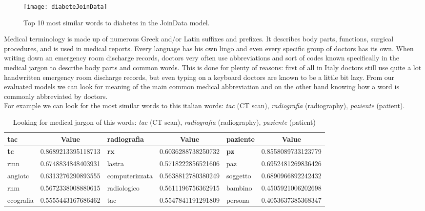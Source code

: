 \begin{figure}[ht]
	\centering
	\texttt{[image: diabeteJoinData]}
	\caption[Diabetes - 10 most similar words plotted for JoinData model]{Top 10 most similar words to diabetes in the JoinData model.}
	\label{fig:diabeteJoinData}
\end{figure}

Medical terminology is made up of numerous Greek and/or Latin suffixes and prefixes. It describes body parts, functions, surgical procedures, and is used in medical reports. Every language has his own lingo and even every specific group of doctors has its own. When writing down an emergency room discharge records, doctors very often use abbreviations and sort of codes known specifically in the medical jargon to describe body parts and common words. This is done for plenty of reasons: first of all in Italy doctors still use quite a lot handwritten emergency room discharge records, but even typing on a keyboard doctors are known to be a little bit lazy.
From our evaluated models we can look for meaning of the main common medical abbreviation and on the other hand knowing how a word is commonly abbreviated by doctors.\\
For example we can look for the most similar words to this italian words: \textit{tac} (CT scan), \textit{radiografia} (radiography), \textit{paziente} (patient).
\begin{table}[h!]
	\begin{center}
		\caption[Most similar words to: \textit{tac} (CT scan), \textit{radiografia} (radiography), \textit{paziente} (patient)]{Looking for medical jargon of this words: \textit{tac} (CT scan), \textit{radiografia} (radiography), \textit{paziente} (patient)}
		\label{tab:tableAbbreviationItalian}
			\begin{tabular}{l|S|l|S|l|S}
				\toprule
				\textbf{tac} & \textbf{Value} & \textbf{radiografia} & \textbf{Value} & \textbf{paziente} & \textbf{Value} \\
				\midrule
				\textbf{tc} & 0.8689213395118713 & \textbf{rx} & 0.6036288738250732 & \textbf{pz} & 0.8558089733123779 \\
				rmn & 0.6748834848403931 & lastra & 0.5718222856521606 & paz & 0.6952481269836426 \\
				angiotc & 0.6313276290893555 & computerizzata & 0.5638812780380249 & soggetto & 0.6890966892242432 \\
				rnm & 0.5672338008880615 & radiologico & 0.5611196756362915 & bambino & 0.4505921006202698 \\			
				ecografia	& 0.5555443167686462 & tac & 0.5547841191291809 & persona & 0.4053637385368347 \\
				\bottomrule
		\end{tabular}
	\end{center}
\end{table}

